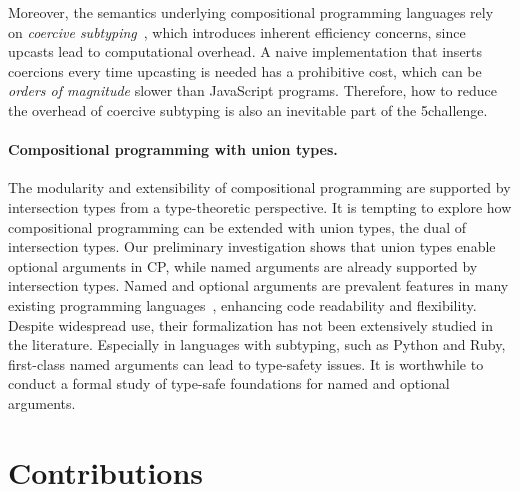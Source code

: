 Moreover, the semantics underlying compositional programming languages rely on
\emph{coercive subtyping}~\citep{luo2013coercive}, which introduces inherent
efficiency concerns, since upcasts lead to computational overhead. A naive
implementation that inserts coercions every time upcasting is needed has a
prohibitive cost, which can be \emph{orders of magnitude} slower than JavaScript
programs. Therefore, how to reduce the overhead of coercive subtyping is also an
inevitable part of the 5\th challenge.

\paragraph{Compositional programming with union types.}
The modularity and extensibility of compositional programming are supported by
intersection types from a type-theoretic perspective. It is tempting to explore
how compositional programming can be extended with union types, the dual of
intersection types. Our preliminary investigation shows that union types enable
optional arguments in CP, while named arguments are already supported by
intersection types. Named and optional arguments are prevalent features in many
existing programming
languages~\citep{garrigue2001labeled,flatt2009keyword,rytz2010named}, enhancing
code readability and flexibility. Despite widespread use, their formalization
has not been extensively studied in the literature. Especially in languages with
subtyping, such as Python and Ruby, first-class named arguments can lead to
type-safety issues. It is worthwhile to conduct a formal study of type-safe
foundations for named and optional arguments.

\section{Contributions}

